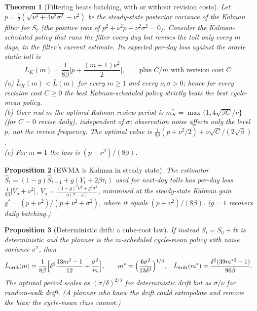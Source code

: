 \documentclass[11pt]{article}
\newtheorem{theorem}{Theorem}[section]
\newtheorem{proposition}[theorem]{Proposition}
\theoremstyle{definition}
\theoremstyle{remark}
\begin{document}
\begin{theorem}[Filtering beats batching, with or without revision costs]\label{thm:kalman}
Let $p=\tfrac12(\sqrt{\nu^4+4\nu^2\sigma^2}-\nu^2)$ be the steady-state posterior variance of the Kalman filter for $S_t$ (the positive root of $p^2+\nu^2p-\nu^2\sigma^2=0$). Consider the \emph{Kalman-scheduled} policy that runs the filter every day but revises the toll only every $m$ days, to the filter's current estimate. Its expected per-day loss against the oracle static toll is
\[\bar L_K(m)=\frac1{8\beta}\Big[p+\frac{(m+1)\nu^2}2\Big],\qquad\text{plus }C/m\text{ with revision cost }C.\]
(a) $\bar L_K(m)<\bar L(m)$ for every $m\ge1$ and every $\nu,\sigma>0$; hence for every revision cost $C\ge0$ the best Kalman-scheduled policy strictly beats the best cycle-mean policy.\\
(b) Over real $m$ the optimal Kalman review period is $m_K^*=\max\{1,4\sqrt{\beta C}/\nu\}$ (for $C=0$ revise daily), independent of $\sigma$; observation noise affects only the level $p$, not the review frequency. The optimal value is $\frac{1}{8\beta}(p+\nu^2/2)+\nu\sqrt{C}/(2\sqrt\beta)$.\\
(c) For $m=1$ the loss is $(p+\nu^2)/(8\beta)$.
\end{theorem}

\begin{proposition}[EWMA is Kalman in steady state]\label{prop:ewma}
The estimator $\hat S_t=(1-g)\hat S_{t-1}+g(Y_t+2\beta\tau_t)$ used for next-day tolls has per-day loss $\frac1{8\beta}\big[V_g+\nu^2\big]$, $V_g=\frac{(1-g)^2\nu^2+g^2\sigma^2}{g(2-g)}$, minimised at the steady-state Kalman gain $g^*=(p+\nu^2)/(p+\nu^2+\sigma^2)$, where it equals $(p+\nu^2)/(8\beta)$. ($g=1$ recovers daily batching.)
\end{proposition}

\begin{proposition}[Deterministic drift: a cube-root law]\label{prop:drift}
If instead $S_t=S_0+\delta t$ is deterministic and the planner is the $m$-scheduled cycle-mean policy with noise variance $\sigma^2$, then
\[\bar L_{\rm drift}(m)=\frac1{8\beta}\Big[\delta^2\frac{13m^2-1}{12}+\frac{\sigma^2}m\Big],\qquad m^*=\Big(\frac{6\sigma^2}{13\delta^2}\Big)^{1/3},\quad\bar L_{\rm drift}(m^*)=\frac{\delta^2(39m^{*2}-1)}{96\beta}.\]
The optimal period scales as $(\sigma/\delta)^{2/3}$ for deterministic drift but as $\sigma/\nu$ for random-walk drift. (A planner who knew the drift could extrapolate and remove the bias; the cycle-mean class cannot.)
\end{proposition}
\end{document}
